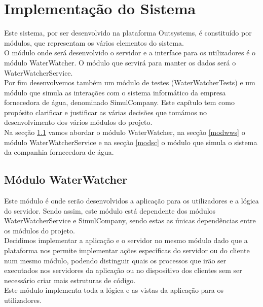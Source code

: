\chapter{Implementação do Sistema} \label{cap:implementacao}

Este sistema, por ser desenvolvido na plataforma Outsystems, é constituído por módulos, que representam os vários elementos do sistema.\\
O módulo onde será desenvolvido o servidor e a interface para os utilizadores é o módulo WaterWatcher. O módulo que servirá para manter os dados será o WaterWatcherService.\\
Por fim desenvolvemos também um módulo de testes (WaterWatcherTests) e um módulo que simula as interações com o sistema informático da empresa fornecedora de água, denominado SimulCompany.
Este capítulo tem como propósito clarificar e justificar as várias decisões que tomámos no desenvolvimento dos vários módulos do projeto.\\
Na secção \ref{modww} vamos abordar o módulo WaterWatcher, na secção \ref{modwws} o módulo WaterWatcherService e na secção \ref{modsc} o módulo que simula o sistema da companhia fornecedora de água.\\


\section{Módulo WaterWatcher} \label{modww} %
Este módulo é onde serão desenvolvidos a aplicação para os utilizadores e a lógica do servidor. Sendo assim, este módulo está dependente dos módulos WaterWatcherService e SimulCompany, sendo estas as únicas dependências entre os módulos do projeto.\\
Decidimos implementar a aplicação e o servidor no mesmo módulo dado que a plataforma nos permite implementar ações específicas do servidor ou do cliente num mesmo módulo, podendo distinguir quais os processos que irão ser executados nos servidores da aplicação ou no dispositivo dos clientes sem ser necessário criar mais estruturas de código.\\
Este módulo implementa toda a lógica e as vistas da aplicação para os utilizadores.

